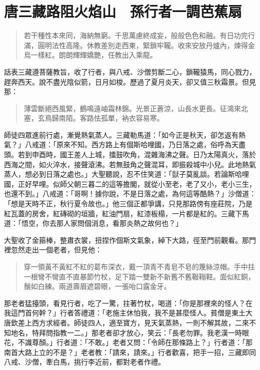 
\chapter{唐三藏路阻火焰山　孫行者一調芭蕉扇}

\begin{quote}
若干種性本來同，海納無窮。千思萬慮終成妄，般般色色和融。有日功完行滿，圓明法性高隆。休教差別走西東，緊鎖牢䪊。收來安放丹爐內，煉得金烏一樣紅。朗朗輝輝嬌艷，任教出入乘龍。
\end{quote}

話表三藏遵菩薩教旨，收了行者，與八戒、沙僧剪斷二心，鎖䪊猿馬，同心戮力，趕奔西天。說不盡光陰似箭，日月如梭。歷過了夏月炎天，卻又值三秋霜景。但見那：
\begin{quote}
薄雲斷絕西風緊，鶴鳴遠岫霜林錦。光景正蒼涼，山長水更長。征鴻來北塞，玄鳥歸南陌。客路怯孤單，衲衣容易寒。
\end{quote}

師徒四眾進前行處，漸覺熱氣蒸人。三藏勒馬道：「如今正是秋天，卻怎返有熱氣？」八戒道：「原來不知。西方路上有個斯哈哩國，乃日落之處，俗呼為天盡頭。若到申酉時，國王差人上城，擂鼓吹角，混雜海沸之聲。日乃太陽真火，落於西海之間，如火淬水，接聲滾沸。若無鼓角之聲混耳，即振殺城中小兒。此地熱氣蒸人，想必到日落之處也。」大聖聽說，忍不住笑道：「獃子莫亂談。若論斯哈哩國，正好早哩。似師父朝三暮二的這等擔閣，就從小至老，老了又小，老小三生，也還不到。」八戒道：「哥啊！據你說，不是日落之處，為何這等酷熱？」沙僧道：「想是天時不正，秋行夏令故也。」他三個正都爭講，只見那路傍有座莊院，乃是紅瓦蓋的房舍，紅磚砌的垣牆，紅油門扇，紅漆板榻，一片都是紅的。三藏下馬道：「悟空，你去那人家問個消息，看那炎熱之故何也？」

大聖收了金箍棒，整肅衣裳，扭捏作個斯文氣象，綽下大路，徑至門前觀看。那門裡忽然走出一個老者，但見他：
\begin{quote}
穿一領黃不黃紅不紅的葛布深衣，戴一頂青不青皂不皂的篾絲涼帽。手中拄一根彎不彎直不直暴節竹杖，足下踏一雙新不新舊不舊靸䩺鞋。面似紅銅，鬚如白練。兩道壽眉遮碧眼，一張咍口露金牙。
\end{quote}

那老者猛擡頭，看見行者，吃了一驚，拄著竹杖，喝道：「你是那裡來的怪人？在我這門首何幹？」行者答禮道：「老施主休怕我，我不是甚麼怪人。貧僧是東土大唐欽差上西方求經者。師徒四人，適至寶方，見天氣蒸熱，一則不解其故，二來不知地名，特拜問指教一二。」那老者卻才放心，笑云：「長老勿罪。我老漢一時眼花，不識尊顏。」行者道：「不敢。」老者又問：「令師在那條路上？」行者道：「那南首大路上立的不是？」老者教：「請來，請來。」行者歡喜，把手一招，三藏即同八戒、沙僧，牽白馬，挑行李近前，都對老者作禮。

